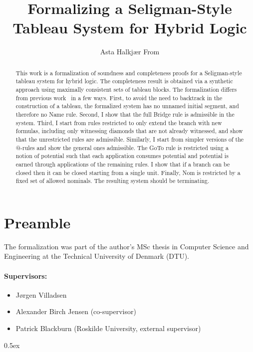 \documentclass[11pt,a4paper]{article}
\begin{document}
\title{Formalizing a Seligman-Style Tableau System for Hybrid Logic}
\author{Asta Halkjær From}
\maketitle

\begin{abstract}
This work is a formalization of soundness and completeness proofs
for a Seligman-style tableau system for hybrid logic. The completeness
result is obtained via a synthetic approach using maximally
consistent sets of tableau blocks. The formalization differs from
previous work~\cite{jlog17, aiml16} in a few ways. First, to avoid the need to backtrack in
the construction of a tableau, the formalized system has no unnamed
initial segment, and therefore no Name rule. Second, I show that the
full Bridge rule is admissible in the system. Third, I start from rules
restricted to only extend the branch with new formulas, including only
witnessing diamonds that are not already witnessed, and show that
the unrestricted rules are admissible. Similarly, I start from simpler
versions of the @-rules and show the general ones admissible.
The GoTo rule is restricted using a notion of potential such that each
application consumes potential and potential is earned through applications of
the remaining rules. I show that if a branch can be closed then it can
be closed starting from a single unit. Finally, Nom is restricted by
a fixed set of allowed nominals. The resulting system should be terminating.
\end{abstract}

\section*{Preamble}

The formalization was part of the author's MSc thesis in Computer Science and Engineering at the Technical University of Denmark (DTU).

\paragraph{Supervisors:}

\begin{itemize}
  \item Jørgen Villadsen
  \item Alexander Birch Jensen (co-supervisor)
  \item Patrick Blackburn (Roskilde University, external supervisor)
\end{itemize}

\newpage
\tableofcontents

\newpage

\parindent 0pt\parskip 0.5ex



\nocite{*}




\end{document}
